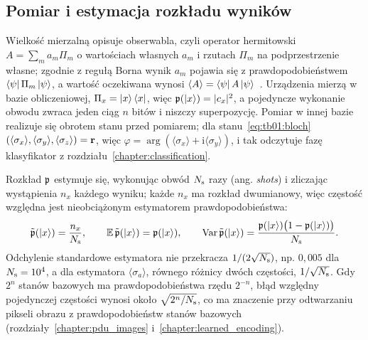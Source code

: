 \subsection{Pomiar i estymacja rozkładu wyników}\label{subsec:tb:measurement}

Wielkość mierzalną opisuje obserwabla, czyli operator hermitowski $A=\sum_m a_m\Pi_m$ o wartościach własnych $a_m$ i rzutach $\Pi_m$ na podprzestrzenie własne; zgodnie z regułą Borna wynik $a_m$ pojawia się z prawdopodobieństwem $\bra{\psi}\Pi_m\ket{\psi}$, a wartość oczekiwana wynosi $\langle A\rangle=\bra{\psi}A\ket{\psi}$~\cite{NielsenChuang2010}.
Urządzenia mierzą w bazie obliczeniowej, $\Pi_x=\ket{x}\bra{x}$, więc $\mathfrak{p}(\ket{x})=|c_x|^2$, a pojedyncze wykonanie obwodu zwraca jeden ciąg $n$ bitów i niszczy superpozycję.
Pomiar w innej bazie realizuje się obrotem stanu przed pomiarem; dla stanu~\eqref{eq:tb01:bloch} $(\langle\sigma_x\rangle,\langle\sigma_y\rangle,\langle\sigma_z\rangle)=\mathbf{r}$, więc $\varphi=\arg(\langle\sigma_x\rangle+\mathrm{i}\langle\sigma_y\rangle)$, i tak odczytuje fazę klasyfikator z rozdziału~\ref{chapter:classification}.

Rozkład $\mathfrak{p}$ estymuje się, wykonując obwód $N_{\mathrm{s}}$ razy (ang. \emph{shots}) i zliczając wystąpienia $n_x$ każdego wyniku; każde $n_x$ ma rozkład dwumianowy, więc częstość względna jest nieobciążonym estymatorem prawdopodobieństwa:
\begin{equation}\label{eq:tb01:estimator}
  \tilde{\mathfrak{p}}(\ket{x})=\frac{n_x}{N_{\mathrm{s}}},\qquad
  \mathbb{E}\,\tilde{\mathfrak{p}}(\ket{x})=\mathfrak{p}(\ket{x}),\qquad
  \mathrm{Var}\,\tilde{\mathfrak{p}}(\ket{x})=\frac{\mathfrak{p}(\ket{x})\bigl(1-\mathfrak{p}(\ket{x})\bigr)}{N_{\mathrm{s}}}.
\end{equation}
Odchylenie standardowe estymatora nie przekracza $1/(2\sqrt{N_{\mathrm{s}}})$, np. $0{,}005$ dla $N_{\mathrm{s}}=10^4$, a dla estymatora $\langle\sigma_a\rangle$, równego różnicy dwóch częstości, $1/\sqrt{N_{\mathrm{s}}}$.
Gdy $2^n$ stanów bazowych ma prawdopodobieństwa rzędu $2^{-n}$, błąd względny pojedynczej częstości wynosi około $\sqrt{2^n/N_{\mathrm{s}}}$, co ma znaczenie przy odtwarzaniu pikseli obrazu z prawdopodobieństw stanów bazowych (rozdziały~\ref{chapter:pdu_images} i~\ref{chapter:learned_encoding}).

